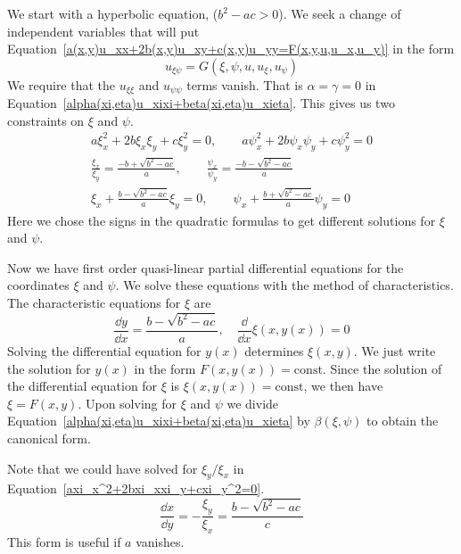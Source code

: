 We start with a hyperbolic equation, ($b^2 - a c > 0$).
We seek a change of independent variables that will put 
Equation~\ref{a(x,y)u_xx+2b(x,y)u_xy+c(x,y)u_yy=F(x,y,u,u_x,u_y)}
in the form
\begin{equation}
  \label{u_xieta=G(xi,eta,u,u_xi,u_eta)}
  u_{\xi \psi} = G(\xi, \psi, u, u_\xi, u_\psi)
\end{equation}
We require that the $u_{\xi\xi}$ and $u_{\psi\psi}$ terms vanish.
That is $\alpha = \gamma = 0$ in 
Equation~\ref{alpha(xi,eta)u_xixi+beta(xi,eta)u_xieta}.
This gives us two constraints on $\xi$ and $\psi$.
\begin{gather}
  \label{axi_x^2+2bxi_xxi_y+cxi_y^2=0}
  a \xi_x^2 + 2 b \xi_x \xi_y + c \xi_y^2 = 0, \qquad a \psi_x^2 + 2 b \psi_x \psi_y + c \psi_y^2 = 0 
  \\
  \nonumber
  \frac{\xi_x}{\xi_y} = \frac{-b + \sqrt{b^2 - a c}}{a}, \qquad
  \frac{\psi_x}{\psi_y} = \frac{-b - \sqrt{b^2 - a c}}{a}
  \\
  \nonumber
  \xi_x + \frac{b - \sqrt{b^2 - a c}}{a} \xi_y = 0, \qquad
  \psi_x + \frac{b + \sqrt{b^2 - a c}}{a} \psi_y = 0
\end{gather}
Here we chose the signs in the quadratic formulas to get different solutions
for $\xi$ and $\psi$.

Now we have first order quasi-linear partial differential equations for 
the coordinates $\xi$ and $\psi$.  We solve these equations with the method
of characteristics.  The characteristic equations for $\xi$ are 
\[
\frac{\dd y}{\dd x} = \frac{b - \sqrt{b^2 - a c}}{a}, \quad
\frac{\dd}{\dd x} \xi(x,y(x)) = 0
\]
Solving the differential equation for $y(x)$ determines 
$\xi(x,y)$.  We just write the solution for $y(x)$ in the form
$F(x,y(x)) = \mathrm{const}$.  Since the solution of the differential equation
for $\xi$ is $\xi(x,y(x)) = \mathrm{const}$, we then have $\xi = F(x,y)$.
Upon solving for $\xi$ and $\psi$ we divide 
Equation~\ref{alpha(xi,eta)u_xixi+beta(xi,eta)u_xieta}
by $\beta(\xi,\psi)$ to obtain the canonical form.





Note that we could have solved for $\xi_y /  \xi_x$ in 
Equation~\ref{axi_x^2+2bxi_xxi_y+cxi_y^2=0}.
\[
\frac{\dd x}{\dd y} = - \frac{\xi_y}{\xi_x} = \frac{b - \sqrt{b^2 - a c}}{c}
\]
This form is useful if $a$ vanishes.





